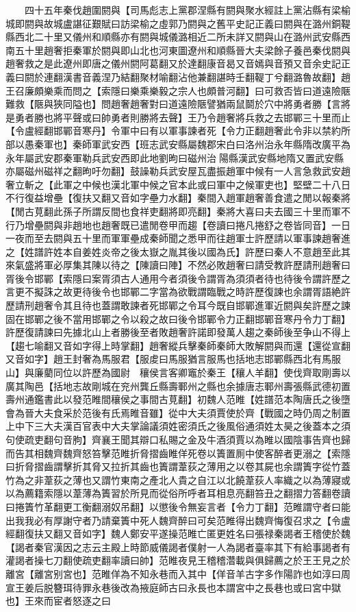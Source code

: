 　　四十五年秦伐趙圍閼與【司馬彪志上黨郡涅縣有閼與聚水經註上黨沾縣有梁榆城即閼與故城盧諶征艱賦曰訪梁榆之虛郭乃閼與之舊平史記正義曰閼與在潞州銅鞮縣西北二十里又儀州和順縣亦有閼與城儀潞相近二所未詳又閼與山在潞州武安縣西南五十里趙奢拒秦軍於閼與即山北也河東圖遼州和順縣晉大夫梁餘子養邑秦伐閼與趙奢救之是此遼州即唐之儀州閼阿葛翻又於達翻康音曷又音嫣與音預又音余史記正義曰閼於連翻漢書音義涅乃結翻聚材喻翻沾他兼翻諶時壬翻鞮丁兮翻潞魯故翻】趙王召廉頗樂乘而問之【索隱曰樂乘樂毅之宗人也頗普河翻】曰可救否皆曰道遠險陿難救【陿與狹同隘也】問趙奢趙奢對曰道遠險陿譬猶兩鼠鬬於穴中將勇者勝【言將是勇者勝也將平聲或曰帥勇者則勝將去聲】王乃令趙奢將兵救之去邯鄲三十里而止【令盧經翻邯鄲音寒丹】令軍中曰有以軍事諫者死【令力正翻趙奢此令非以禁約所部以愚秦軍也】秦師軍武安西【班志武安縣屬魏郡宋白曰洛州治永年縣隋改廣平為永年屬武安郡秦軍勒兵武安西即此地劉昫曰磁州治陽縣漢武安縣地隋又置武安縣亦屬磁州磁祥之翻昫吁勿翻】鼓譟勒兵武安屋瓦盡振趙軍中候有一人言急救武安趙奢立斬之【此軍之中候也漢北軍中候之官本此或曰軍中之候軍吏也】堅壁二十八日不行復益增壘【復扶又翻又音如字壘力水翻】秦間入趙軍趙奢善食遣之閒以報秦將【閒古莧翻此孫子所謂反間也食祥吏翻將即亮翻】秦將大喜曰夫去國三十里而軍不行乃增壘閼與非趙地也趙奢既已遣閒卷甲而趨【卷讀曰捲凡捲舒之卷皆同音】一日一夜而至去閼與五十里而軍軍壘成秦師聞之悉甲而往趙軍士許歷請以軍事諫趙奢進之【姓譜許姓本自姜姓炎帝之後太嶽之胤其後以國為氏】許歷曰秦人不意趙至此其來氣盛將軍必厚集其陳以待之【陳讀曰陣】不然必敗趙奢曰請受教許歷請刑趙奢曰胥後令邯鄲【索隱曰案胥須古人通用今者須後令謂胥為須須者待也待後令謂許歷之言更不擬誅之故更待後令也邯鄲二字當為欲戰謂臨戰之時許歷復諫也余謂胥語絶許歷請刑趙奢令其且待也蓋謂敢諫者死邯鄲之令耳今既自邯鄲進軍近閼與矣許歷之諫固在邯鄲之後不當用邯鄲之令以殺之故曰後令邯鄲令力正翻邯鄲音寒丹令力丁翻】許歷復請諫曰先據北山上者勝後至者敗趙奢許諾即發萬人趨之秦師後至争山不得上【趨七喻翻又音如字得上時掌翻】趙奢縱兵擊秦師秦師大敗解閼與而還【還從宣翻又音如字】趙王封奢為馬服君【服䖍曰馬服猶言服馬也括地志邯鄲縣西北有馬服山】與廉藺同位以許歷為國尉　穰侯言客卿竈於秦王【穰人羊翻】使伐齊取剛壽以廣其陶邑【括地志故剛城在兖州龔丘縣壽鄆州之縣也余據唐志鄆州壽張縣武德初置壽州通鑑書此以發范睢間穰侯之事間古莧翻】初魏人范睢【姓譜范本陶唐氏之後墮會為晉大夫食采於范後有氏焉睢音雖】從中大夫須賈使於齊【戰國之時仍周之制置上中下三大夫漢百官表中大夫掌論議須姓密須氏之後風俗通須姓太昊之後蓋本之須句使疏吏翻句音朐】齊襄王聞其辯口私賜之金及牛酒須賈以為睢以國陰事告齊也歸而告其相魏齊魏齊怒笞擊范睢折脅摺齒睢佯死卷以簀置厠中使客醉者更溺之【索隱曰折脅摺齒謂擊折其脅又拉折其齒也簀謂葦荻之薄用之以卷其屍也余謂簀字從竹蓋竹為之非葦荻之薄也又謂竹東南之產北人貴之自江以北饒葦荻人率織之以為薄寢或以為薦籍索隱以葦薄為簀習於所見而從俗所呼者耳相息亮翻笞丑之翻摺力答翻卷讀曰捲簀竹革翻更工衡翻溺奴吊翻】以懲後令無妄言者【令力丁翻】范睢謂守者曰能出我我必有厚謝守者乃請棄簀中死人魏齊醉曰可矣范睢得出魏齊悔復召求之【令盧經翻復扶又翻又音如字】魏人鄭安平遂操范睢亡匿更姓名曰張禄秦謁者王稽使於魏【謁者秦官漢因之志云主殿上時節威儀謁者僕射一人為謁者臺率其下有給事謁者有灌謁者操七刀翻使疏吏翻率讀曰帥】范睢夜見王稽稽濳載與俱歸薦之於王王見之於離宮【離宮别宮也】范睢佯為不知永巷而入其中【佯音羊古字多作陽詐也如淳曰周宣王姜后脱簪珥待罪永巷後改為掖庭師古曰永長也本謂宮中之長巷也或曰宮中獄也】王來而宦者怒逐之曰